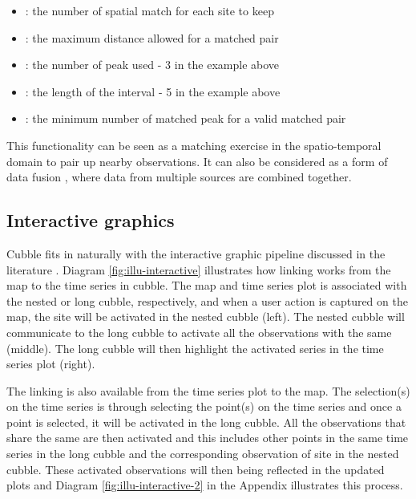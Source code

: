 \documentclass[
]{jss}
\providecommand{\tightlist}{%
  \setlength{\itemsep}{0pt}\setlength{\parskip}{0pt}}
\begin{document}
\begin{itemize}
\tightlist
\item
  : the number of spatial match for each site to
  keep
\item
  : the maximum distance allowed for a matched
  pair
\item
  : the number of peak used - 3 in the example
  above
\item
  : the length of the interval - 5 in the example
  above
\item
  : the minimum number of matched peak for a
  valid matched pair
\end{itemize}

This functionality can be seen as a matching exercise
\citep{stuart2010matching, mcintosh2018using} in the spatio-temporal
domain to pair up nearby observations. It can also be considered as a
form of data fusion \citep{cocchi2019data}, where data from multiple
sources are combined together.

\hypertarget{interactive-graphics}{%
\subsection{Interactive graphics}\label{interactive-graphics}}

Cubble fits in naturally with the interactive graphic pipeline discussed
in the literature
\citep{buja1988elements, buja1996interactive, sutherland2000orca, xie2014reactive, cheng2016enabling}.
Diagram \ref{fig:illu-interactive} illustrates how linking works from
the map to the time series in cubble. The map and time series plot is
associated with the nested or long cubble, respectively, and when a user
action is captured on the map, the site will be activated in the nested
cubble (left). The nested cubble will communicate to the long cubble to
activate all the observations with the same  (middle). The long
cubble will then highlight the activated series in the time series plot
(right).

The linking is also available from the time series plot to the map. The
selection(s) on the time series is through selecting the point(s) on the
time series and once a point is selected, it will be activated in the
long cubble. All the observations that share the same  are then
activated and this includes other points in the same time series in the
long cubble and the corresponding observation of site in the nested
cubble. These activated observations will then being reflected in the
updated plots and Diagram \ref{fig:illu-interactive-2} in the Appendix
illustrates this process.
\end{document}
